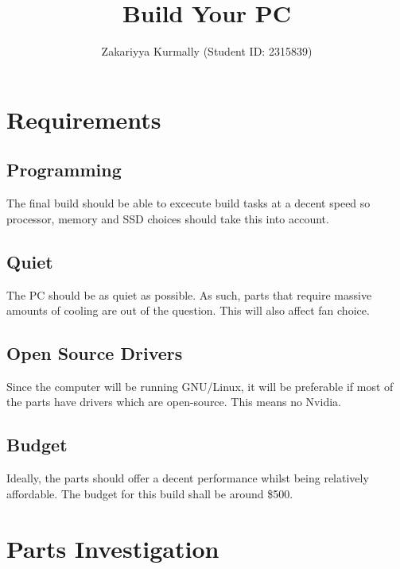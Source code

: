 \documentclass[12pt, a4paper]{article}
\title{Build Your PC}
\author{Zakariyya Kurmally (Student ID: 2315839)}
\begin{document}
\maketitle
\pagebreak
\tableofcontents
\pagebreak


\section{Requirements}

\subsection{Programming}
The final build should be able to excecute build tasks at a decent speed
so processor, memory and SSD choices should take this into account.

\subsection{Quiet}
The PC should be as quiet as possible. As such, parts that require 
massive amounts of cooling are out of the question. This will also
affect fan choice.

\subsection{Open Source Drivers}
Since the computer will be running GNU/Linux, it will be preferable if most of 
the parts have drivers which are open-source. This means no Nvidia.

\subsection{Budget}
Ideally, the parts should offer a decent performance whilst being
relatively affordable. The budget for this build shall be around
\$500.



\section{Parts Investigation}
\end{document}
